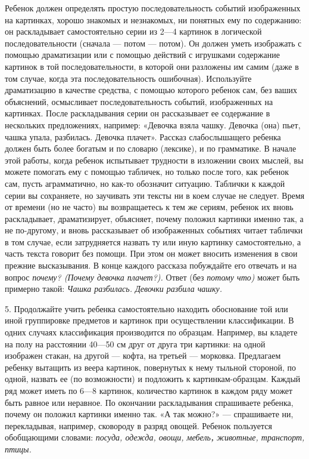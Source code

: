 \documentclass{book}
\renewcommand{\emph}[1]{\textit{#1}}
\begin{document}
Ребенок должен определять простую последовательность событий
изображенных на картинках, хорошо знакомых и незнакомых, ни понятных ему
по содержанию: он раскладывает самостоятельно серии из 2---4 картинок в
логической последовательности (сначала --- потом --- потом). Он должен
уметь изображать с помощью драматизации или с помощью действий с
игрушками содержание картинок в той последовательности, в которой они
разложены им самим (даже в том случае, когда эта последовательность
ошибочная). Используйте драматизацию в качестве средства, с помощью
которого ребенок сам, без ваших объяснений, осмысливает
последовательность событий, изображенных на картинках. После
раскладывания серии он рассказывает ее содержание в нескольких
предложениях, например: «Девочка взяла чашку. Девочка (она) пьет, чашка
упала, разбилась. Девочка плачет». Рассказ слабослышащего ребенка должен
быть более богатым и по словарю (лексике), и по грамматике. В начале
этой работы, когда ребенок испытывает трудности в изложении своих
мыслей, вы можете помогать ему с помощью табличек, но только после того,
как ребенок сам, пусть аграмматично, но как-то обозначит ситуацию.
Таблички к каждой серии вы сохраняете, но заучивать эти тексты ни в коем
случае не следует. Время от времени (но не часто) вы возвращаетесь к тем
же сериям, ребенок их вновь раскладывает, драматизирует, объясняет,
почему положил картинки именно так, а не по-другому, и вновь
рассказывает об изображенных событиях читает таблички в том случае, если
затрудняется назвать ту или иную картинку самостоятельно, а часть текста
говорит без помощи. При этом он может вносить изменения в свои прежние
высказывания. В конце каждого рассказа побуждайте его отвечать и на
вопрос \emph{почему? (Почему девочка плачет?).} Ответ (без \emph{потому
что)} может быть примерно такой: \emph{Чашка разбилась. Девочки разбила
чашку.}

5. Продолжайте учить ребенка самостоятельно находить обоснование той или
иной группировке предметов и картинок при осуществлении классификации. В
одних случаях классификация производится по образцам. Например, вы
кладете на полу на расстоянии 40---50 см друг от друга три картинки: на
одной изображен стакан, на другой --- кофта, на третьей --- морковка.
Предлагаем ребенку вытащить из веера картинок, повернутых к нему тыльной
стороной, по одной, назвать ее (по возможности) и подложить к
картинкам-образцам. Каждый ряд может иметь по 6---8 картинок, количество
картинок в каждом ряду может быть равное или неравное. По окончании
раскладывания спрашиваете ребенка, почему он положил картинки именно
так. «А так можно?» --- спрашиваете ни, перекладывая, например,
сковороду в разряд овощей. Ребенок пользуется обобщающими словами:
\emph{посуда, одежда, овощи, мебель\textbf{,} животные, транспорт,
птицы.}
\end{document}
